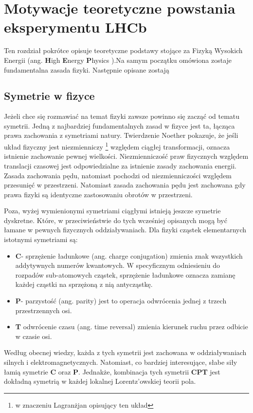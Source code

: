 \chapter{Motywacje teoretyczne powstania eksperymentu LHCb}

Ten rozdział pokrótce opisuje teoretyczne podstawy stojące za Fizyką Wysokich Energii (ang. \textbf{H}igh \textbf{E}nergy \textbf{P}hysics ).Na samym początku omówiona zostaje fundamentalna zasada fizyki. Następnie opisane zostają 

\section{Symetrie w fizyce}
Jeżeli chce się rozmawiać na temat fizyki zawsze powinno się zacząć od tematu symetrii. Jedną z najbardziej fundamentalnych zasad w fizyce jest ta, łącząca prawa zachowania z symetriami natury. Twierdzenie Noether pokazuje, że jeśli układ fizyczny jest niezmienniczy \footnote{w znaczeniu Lagranżjan opisujący ten układ} względem ciągłej transformacji, oznacza istnienie zachowanie pewnej wielkości. Niezmienniczość praw fizycznych względem translacji czasowej jest odpowiedzialne za istnienie zasady zachowania energii. Zasada zachowania pędu, natomiast pochodzi od niezmienniczości względem przesunięć w przestrzeni. Natomiast zasada zachowania pędu jest zachowana gdy prawa fizyki są identyczne zastosowaniu obrotów w przestrzeni. 

Poza, wyżej wymienionymi symetriami ciągłymi istnieją jeszcze symetrie dyskretne. Które, w przeciwieństwie do tych wcześniej opisanych mogą być łamane w pewnych fizycznych oddziaływaniach. Dla fizyki cząstek elementarnych istotnymi symetriami są:

\begin{itemize}
\item \textbf{C}- sprzężenie ładunkowe (ang. charge conjugation) zmienia znak wszystkich addytywnych numerów kwantowych. W specyficznym odniesieniu do rozpadów sub-atomowych cząstek, sprzężenie ładunkowe oznacza zamianę każdej cząstki na sprzężoną z nią antycząstkę.
\item \textbf{P}- parzystość (ang. parity) jest to operacja odwrócenia jednej z trzech przestrzennych osi.
\item \textbf{T} odwrócenie czasu (ang. time reversal) zmienia kierunek ruchu przez odbicie w czasie osi. 
\end{itemize}

Według obecnej wiedzy, każda z tych symetrii jest zachowana w oddziaływaniach silnych i elektromagnetycznych. Natomiast, co bardziej interesujące, słabe siły łamią symetrie \textbf{C} oraz \textbf{P}. Jednakże, kombinacja tych symetrii \textbf{CPT} jest dokładną symetrią w każdej lokalnej Lorentz'owskiej teorii pola.

